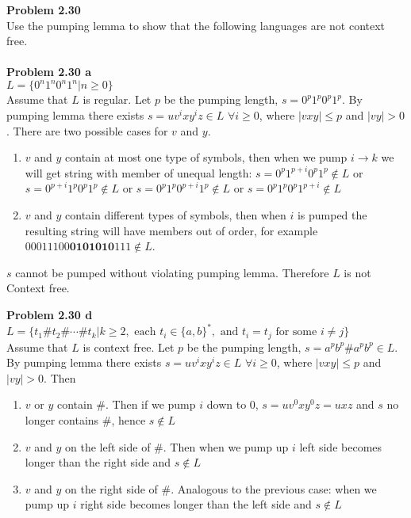 \documentclass{article}
\newcommand{\problem}[1]{\large{\textbf{Problem #1} \\}}
\begin{document}
\problem{2.30}
Use the pumping lemma to show that the following languages are not context free. \\ \\
\problem{2.30 a}
$L = \{ 0^n 1^n 0^n 1^n | n \geq 0  \}$ \\

Assume that $L$ is regular. Let $p$ be the pumping length, $s = 0^p 1^p 0^p 1^p$. By pumping lemma 
there exists $s = uv^ixy^iz \in L$ $\forall i \geq 0$, where $|vxy| \leq p$ and $|vy| > 0$. There are two 
possible cases for $v$ and $y$.
\begin{enumerate}[\underline{Case} 1., leftmargin = 1.5cm]
\itemsep0em
\item $v$ and $y$ contain at most one type of symbols, then when
we pump $i \rightarrow k$ we will get string with member of unequal length:
 $s = 0^p 1^{p+i} 0^p 1^p \notin L$ or $s = 0^{p+i} 1^p 0^p 1^p \notin L$ or $s = 0^p 1^p 0^{p+i} 1^p \notin L$ or 
$s = 0^{p} 1^p 0^{p} 1^{p+i} \notin L$
\item $v$ and $y$ contain different types of symbols, then when $i$ is pumped the resulting 
string will have members out of order, for example $00011100\mathbf{0101010}111 \notin L$.
\end{enumerate} 

$s$ cannot be pumped without violating pumping lemma. Therefore $L$ is not Context free.

\pagebreak

\problem{2.30 d}
$L = \{ t_1 \# t_2 \# \cdots \# t_k | k \geq 2,\text{ each } t_i \in \{a,b\}^*,
\text{ and }t_i = t_j\text{ for some } i \neq j  \}$  \\

Assume that $L$ is context free. Let $p$ be the pumping length, $s = a^p b ^p \# a^p b^p \in L$. By pumping lemma 
there exists $s = uv^ixy^iz \in L$ $\forall i \geq 0$, where $|vxy| \leq p$ and $|vy| > 0$. Then 
\begin{enumerate}[\underline{Case} 1., leftmargin = 1.5cm]
\itemsep0em
\item $v$ or $y$ contain $\#$. Then if we pump $i$ down to $0$, $s = uv^0xy^0z = uxz$ and $s$ no longer contains $\#$, hence $s \notin L$
\item $v$ and $y$ on the left side of $\#$. Then when we pump up $i$ left side becomes longer than the right side and $s \notin L$
\item $v$ and $y$ on the right side of $\#$. Analogous to the previous case: when we pump up $i$ right side becomes longer than the left side and  $s \notin L$
\end{enumerate}
\end{document}
